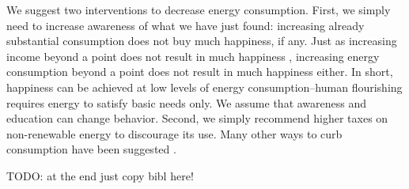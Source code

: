 \documentclass[10pt, letterpaper]{article}
\begin{document}
\begin{spacing}{1.5}
We suggest two interventions to decrease energy consumption. First, we simply
need to increase awareness of what we have just found: increasing
already substantial consumption does not buy much happiness, if any. Just as increasing  income
 beyond a point does not result in much happiness \citep{kahneman10}, increasing
 energy consumption beyond a point does not result in much happiness
 either. %
  In short, happiness can be achieved at low
 levels of energy consumption--human flourishing requires energy to satisfy
 basic needs only. We assume that awareness and education can change behavior.
 Second, we simply recommend higher taxes on non-renewable
 energy to discourage its use. Many other ways to
 curb consumption have been suggested \citep{dietz14B,dietz15,asensio15, dumas87,attari10}.





\newpage %


TODO: at the end just copy bibl here!









\end{spacing}
\end{document}

